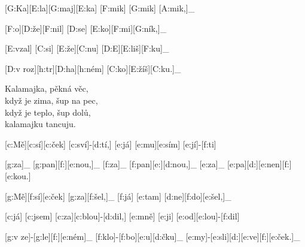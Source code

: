 
{\minw=6mm
[G:Ka][E:la][G:maj][E:ka] [F:mik] [G:mik] [A:mik,]_

[F:o][D:že][F:nil] [D:se] [E:ko][F:mi][G:ník,]_

[E:vzal] [C:si] [E:že][C:nu] [D:E][E:liš][F:ku]_

[D:v roz][h:tr][D:ha][h:ném] [C:ko][E:žíš][C:ku.]_
}

Kalamajka, pěkná věc,\\
když je zima, šup na pec,\\
když je teplo, šup dolů,\\
kalamajku tancuju.



{\minw=6mm
[c:Mě][c:sí][c:ček] [c:sví]-[d:tí,] %
[e:já] [e:mu][e:sím] [e:jí]-[f:ti]

\minw=5mm
[g:za]_ [g:pan][f:][e:nou,]_
[f:za]_ [f:pan][e:][d:nou,]_
[e:za]_ [e:pa][d:][e:nen][f:][e:kou.]

\minw=6mm
[g:Mě][f:sí][e:ček] [g:za][f:šel,]_
[f:já] [e:tam] [d:ne][f:do][e:šel,]_

[c:já] [c:jsem] [c:za][c:blou]-[d:dil,] %
[e:mně] [e:ji] [e:od][e:lou]-[f:dil]

\minw=5mm
[g:v ze]-[g:le][f:][e:ném]_
[f:klo]-[f:bo][e:u][d:čku]_
[e:my]-[e:sli][d:][e:ve][f:][e:ček.]_
}


\bye
